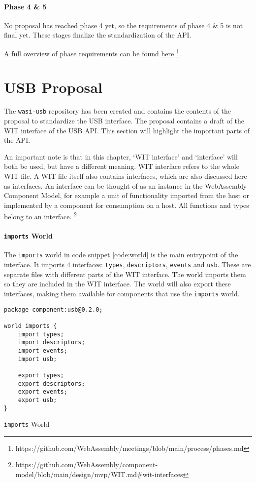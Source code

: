 \paragraph{Phase 4 \& 5}

No proposal has reached phase 4 yet, so the requirements of phase 4 \& 5 is not final yet. These stages finalize the standardization of the API.


A full overview of phase requirements can be found \href{https://github.com/WebAssembly/meetings/blob/main/process/phases.md}{here} \footnote{https://github.com/WebAssembly/meetings/blob/main/process/phases.md}.

\section{USB Proposal}
The \texttt{wasi-usb} repository \cite{wasi_usb} has been created and contains the contents of the proposal to standardize the USB interface. The proposal contains a draft of the \acrshort{WIT} interface of the USB API. This section will highlight the important parts of the API.

An important note is that in this chapter, `WIT interface' and `interface' will both be used, but have a different meaning.
WIT interface refers to the whole WIT file.
A WIT file itself also contains interfaces, which are also discussed here as interfaces. An interface can be thought of as an instance in the WebAssembly Component Model, for example a unit of functionality imported from the host or implemented by a component for consumption on a host. All functions and types belong to an interface. \footnote{https://github.com/WebAssembly/component-model/blob/main/design/mvp/WIT.md\#wit-interfaces}

\paragraph{\texttt{imports} World}
The \texttt{imports} world in code snippet \ref{code:world} is the main entrypoint of the interface. It imports 4 interfaces: \texttt{types}, \texttt{descriptors}, \texttt{events} and \texttt{usb}. These are separate files with different parts of the WIT interface. The world imports them so they are included in the WIT interface. The world will also export these interfaces, making them available for components that use the \texttt{imports} world.\\

\begin{code}
\begin{verbatim}
package component:usb@0.2.0;

world imports {
	import types;
	import descriptors;
	import events;
	import usb;

	export types;
	export descriptors;
	export events;
	export usb;
}
\end{verbatim}
\caption{\texttt{imports} World}
\label{code:world}
\end{code}

